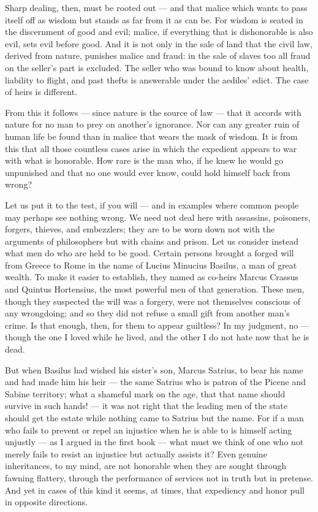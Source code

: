  Sharp dealing, then, must be rooted out — and that malice which wants to pass itself off as wisdom but stands as far from it as can be. For wisdom is seated in the discernment of good and evil; malice, if everything that is dishonorable is also evil, sets evil before good. And it is not only in the sale of land that the civil law, derived from nature, punishes malice and fraud: in the sale of slaves too all fraud on the seller's part is excluded. The seller who was bound to know about health, liability to flight, and past thefts is answerable under the aediles' edict. The case of heirs is different.

 From this it follows — since nature is the source of law — that it accords with nature for no man to prey on another's ignorance. Nor can any greater ruin of human life be found than in malice that wears the mask of wisdom. It is from this that all those countless cases arise in which the expedient appears to war with what is honorable. How rare is the man who, if he knew he would go unpunished and that no one would ever know, could hold himself back from wrong?

 Let us put it to the test, if you will — and in examples where common people may perhaps see nothing wrong. We need not deal here with assassins, poisoners, forgers, thieves, and embezzlers; they are to be worn down not with the arguments of philosophers but with chains and prison. Let us consider instead what men do who are held to be good. Certain persons brought a forged will from Greece to Rome in the name of Lucius Minucius Basilus, a man of great wealth. To make it easier to establish, they named as co-heirs Marcus Crassus and Quintus Hortensius, the most powerful men of that generation. These men, though they suspected the will was a forgery, were not themselves conscious of any wrongdoing; and so they did not refuse a small gift from another man's crime. Is that enough, then, for them to appear guiltless? In my judgment, no — though the one I loved while he lived, and the other I do not hate now that he is dead.

 But when Basilus had wished his sister's son, Marcus Satrius, to bear his name and had made him his heir — the same Satrius who is patron of the Picene and Sabine territory; what a shameful mark on the age, that that name should survive in such hands! — it was not right that the leading men of the state should get the estate while nothing came to Satrius but the name. For if a man who fails to prevent or repel an injustice when he is able to is himself acting unjustly — as I argued in the first book — what must we think of one who not merely fails to resist an injustice but actually assists it? Even genuine inheritances, to my mind, are not honorable when they are sought through fawning flattery, through the performance of services not in truth but in pretense. And yet in cases of this kind it seems, at times, that expediency and honor pull in opposite directions.

